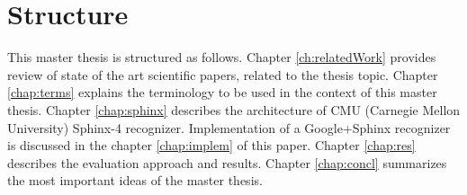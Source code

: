 \section {Structure}
This master thesis is structured as follows. Chapter \ref{ch:relatedWork}
provides review of state of the art scientific papers, related to the thesis
topic. Chapter \ref{chap:terms} explains the terminology to be used in the
context of this master thesis.  Chapter \ref{chap:sphinx} describes the
architecture of CMU (Carnegie Mellon University) Sphinx-4 recognizer.
Implementation of a Google+Sphinx recognizer is discussed in the chapter \ref{chap:implem} of this paper. Chapter \ref{chap:res} describes the
evaluation approach and results. Chapter \ref{chap:concl} summarizes the most
important ideas of the master thesis.
